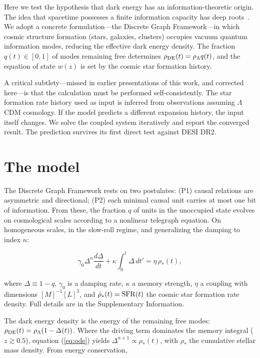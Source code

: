 \documentclass[12pt,a4paper]{article}
\begin{document}
Here we test the hypothesis that dark energy has an information-theoretic origin. The idea that spacetime possesses a finite information capacity has deep roots~\cite{thooft1993,susskind1995,sorkin2005,verlinde2011,jacobson1995}. We adopt a concrete formulation---the Discrete Graph Framework---in which cosmic structure formation (stars, galaxies, clusters) occupies vacuum quantum information modes, reducing the effective dark energy density. The fraction $q(t)\in[0,1]$ of modes remaining free determines $\rho_{\rm DE}(t)=\rho_\Lambda q(t)$, and the equation of state $w(z)$ is set by the cosmic star formation history.

A critical subtlety---missed in earlier presentations of this work, and corrected here---is that the calculation must be performed self-consistently. The star formation rate history used as input is inferred from observations assuming $\Lambda$CDM cosmology. If the model predicts a different expansion history, the input itself changes. We solve the coupled system iteratively and report the converged result. The prediction survives its first direct test against DESI DR2.

\section*{The model}

The Discrete Graph Framework rests on two postulates: (P1) causal relations are asymmetric and directional; (P2) each minimal causal unit carries at most one bit of information. From these, the fraction $q$ of units in the unoccupied state evolves on cosmological scales according to a nonlinear telegraph equation. On homogeneous scales, in the slow-roll regime, and generalizing the damping to index $n$:

\begin{equation}\label{eq:ode}
\gamma_0\Delta^n\frac{d\Delta}{dt} + \kappa\int_0^t\Delta\,dt' = \eta\,\dot{\rho}_*(t),
\end{equation}

where $\Delta\equiv1-q$, $\gamma_0$ is a damping rate, $\kappa$ a memory strength, $\eta$ a coupling with dimensions $[M]^{-1}[L]^{3}$, and $\dot{\rho}_*(t)={\rm SFR}(t)$ the cosmic star formation rate density. Full details are in the Supplementary Information.

The dark energy density is the energy of the remaining free modes: $\rho_{\rm DE}(t)=\rho_\Lambda(1-\Delta(t))$. Where the driving term dominates the memory integral ($z\gtrsim0.5$), equation (\ref{eq:ode}) yields $\Delta^{n+1}\propto\rho_*(t)$, with $\rho_*$ the cumulative stellar mass density. From energy conservation,
\end{document}
